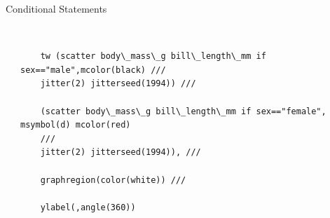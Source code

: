 \documentclass[shownotes,12pt, aspectratio=169]{beamer}
\begin{document}
\begin{frame}[t]{Conditional Statements}
  \begin{columns}
  \begin{column}[T]{.5\textwidth}
    \begin{center}
  \end{center}
  \end{column}
  \hfill
  \begin{column}[T]{.5\textwidth}
  \begin{verbatim}

    tw (scatter body\_mass\_g bill\_length\_mm if sex=="male",mcolor(black) ///
    jitter(2) jitterseed(1994)) ///

    (scatter body\_mass\_g bill\_length\_mm if sex=="female", msymbol(d) mcolor(red)
    ///
    jitter(2) jitterseed(1994)), ///

    graphregion(color(white)) ///

    ylabel(,angle(360))
  \end{verbatim}
  \end{column}
  \end{columns}

\end{frame}
\end{document}
